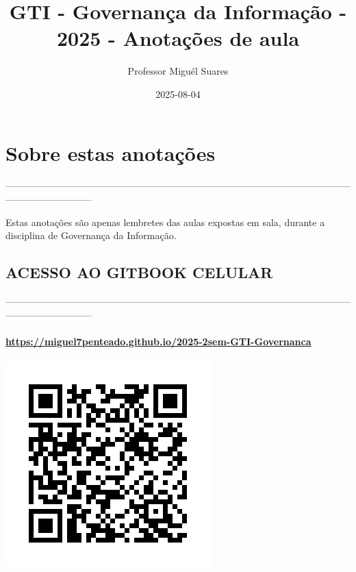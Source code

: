 \documentclass[
]{book}
\title{GTI - Governança da Informação - 2025 - Anotações de aula}
\author{Professor Miguél Suares}
\date{2025-08-04}
\begin{document}
\maketitle

{
\setcounter{tocdepth}{1}
\tableofcontents
}
\chapter*{Sobre estas anotações}\label{sobre-estas-anotauxe7uxf5es}

---------------------------------------------------------------------------------------------------------------------------------------

Estas anotações são apenas lembretes das aulas expostas em sala, durante a disciplina de Governança da Informação.

\section{ACESSO AO GITBOOK CELULAR}\label{acesso-ao-gitbook-celular}

---------------------------------------------------------------------------------------------------------------------------------------

\subsubsection{\texorpdfstring{\url{https://miguel7penteado.github.io/2025-2sem-GTI-Governanca}}{https://miguel7penteado.github.io/2025-2sem-GTI-Governanca}}\label{httpsmiguel7penteado.github.io2025-2sem-gti-governanca}

\includegraphics{images/qr-code-disciplina.jpg}
\end{document}
